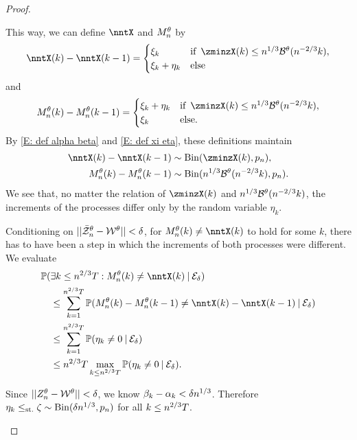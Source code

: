 \begin{proof}
\begin{proofpart}
This way, we can define $\nntX$ and $M_n^{\theta}$ by
\begin{equation}
\nntX(k) - \nntX(k-1) = 
\begin{cases}
\xi_k & \text{if} \enspace \zminzX(k) \leq \n{1}{3}\BtX(\n{-2}{3}k), \\
\xi_k + \eta_k &\text{else}
\end{cases}
\end{equation}
and
\begin{equation}
\Ndis(k) - \Ndis(k-1) = 
\begin{cases}
\xi_k + \eta_k & \text{if} \enspace \zminzX(k) \leq \n{1}{3}\BtX(\n{-2}{3}k), \\
\xi_k &\text{else}.
\end{cases}
\end{equation}
By \eqref{E: def alpha beta} and \eqref{E: def xi eta},
these definitions maintain
\begin{equation*}
\begin{aligned}
\nntX(k) - \nntX(k-1) &\sim \Binom(\zminzX(k), \p), \\
\Ndis(k) - \Ndis(k-1) &\sim \Binom(\n{1}{3} \BtX(\n{-2}{3}k), \p).
\end{aligned}
\end{equation*}
We see that, no matter the relation of $\zminzX(k)$ and $n^{1 / 3}\mathcal{B}^{\theta}(n^{-2 / 3}k)$, 
the increments of the processes differ only by the random variable $\eta_k$.

Conditioning on $||\bar{\mathcal{Z}}^{\theta}_n - \mathcal{W}^{\theta}|| < \delta$, for $\Ndis(k) \neq \nntX(k)$ to hold for some $k$,
there has to have been a step in which the increments of both processes were different.
We evaluate
\begin{equation} \label{E: Prob eta not 0}
\begin{aligned}
&\Prob(\exists k\leq \n{2}{3}T: \Ndis(k) \neq \nntX(k) \cond \Event{\delta}) \\
&\quad \leq \sum_{k=1}^{\n{2}{3}T} \Prob( \Ndis(k) - \Ndis(k-1) \neq \nntX(k) - \nntX(k-1) \cond \Event{\delta}) \\
&\quad \leq \sum_{k=1}^{\n{2}{3}T} \Prob( \eta_k \neq 0 \cond \Event{\delta}) \\
&\quad \leq \n{2}{3}T \max_{k \leq \n{2}{3}T} \Prob(\eta_k \neq 0 \cond \Event{\delta}).
\end{aligned}
\end{equation}

Since $||Z_n^{\theta} - \mathcal{W}^{\theta}|| < \delta$, we know $\beta_k - \alpha_k < \delta n^{1 / 3}$. Therefore
$\eta_k \leq_{\text{st.}} \zeta \sim \operatorname*{Bin}(\delta n^{1 / 3}, p_n)$ for all $k \leq n^{2 / 3}T$.


\end{proofpart}
\end{proof}
